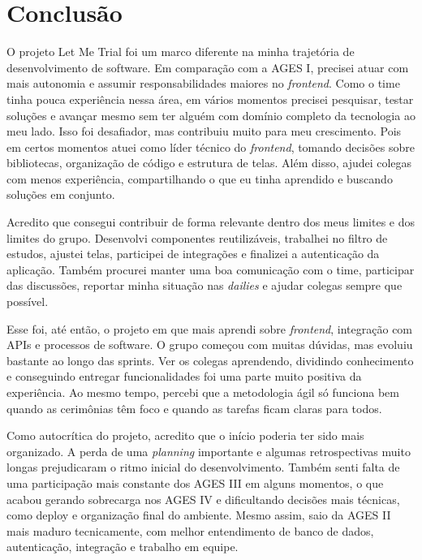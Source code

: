 \section[Conclusão]{Conclusão}

O projeto Let Me Trial foi um marco diferente na minha trajetória de desenvolvimento de software. Em comparação com a AGES I, precisei atuar com mais autonomia e assumir responsabilidades maiores no \textit{frontend}. Como o time tinha pouca experiência nessa área, em vários momentos precisei pesquisar, testar soluções e avançar mesmo sem ter alguém com domínio completo da tecnologia ao meu lado. Isso foi desafiador, mas contribuiu muito para meu crescimento. Pois em certos momentos atuei como líder técnico do \textit{frontend}, tomando decisões sobre bibliotecas, organização de código e estrutura de telas. Além disso, ajudei colegas com menos experiência, compartilhando o que eu tinha aprendido e buscando soluções em conjunto.

Acredito que consegui contribuir de forma relevante dentro dos meus limites e dos limites do grupo. Desenvolvi componentes reutilizáveis, trabalhei no filtro de estudos, ajustei telas, participei de integrações e finalizei a autenticação da aplicação. Também procurei manter uma boa comunicação com o time, participar das discussões, reportar minha situação nas \textit{dailies} e ajudar colegas sempre que possível.

Esse foi, até então, o projeto em que mais aprendi sobre \textit{frontend}, integração com APIs e processos de software. O grupo começou com muitas dúvidas, mas evoluiu bastante ao longo das sprints. Ver os colegas aprendendo, dividindo conhecimento e conseguindo entregar funcionalidades foi uma parte muito positiva da experiência. Ao mesmo tempo, percebi que a metodologia ágil só funciona bem quando as cerimônias têm foco e quando as tarefas ficam claras para todos.

Como autocrítica do projeto, acredito que o início poderia ter sido mais organizado. A perda de uma \textit{planning} importante e algumas retrospectivas muito longas prejudicaram o ritmo inicial do desenvolvimento. Também senti falta de uma participação mais constante dos AGES III em alguns momentos, o que acabou gerando sobrecarga nos AGES IV e dificultando decisões mais técnicas, como deploy e organização final do ambiente. Mesmo assim, saio da AGES II mais maduro tecnicamente, com melhor entendimento de banco de dados, autenticação, integração e trabalho em equipe.
